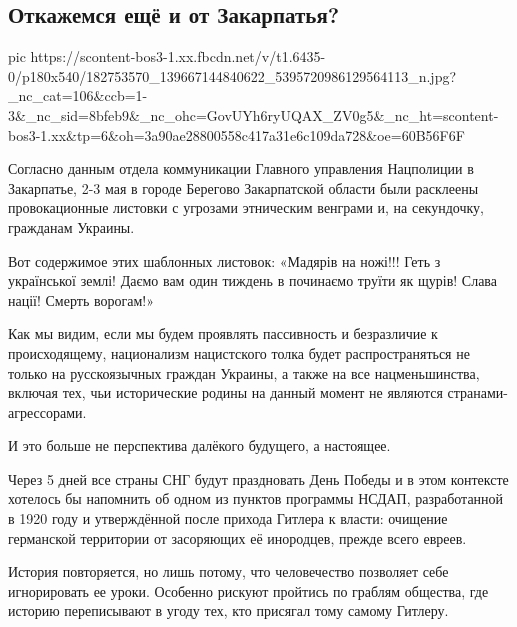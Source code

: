  
 
 
 
 
\subsection{Откажемся ещё и от Закарпатья?}

\ifcmt
  pic https://scontent-bos3-1.xx.fbcdn.net/v/t1.6435-0/p180x540/182753570_139667144840622_5395720986129564113_n.jpg?_nc_cat=106&ccb=1-3&_nc_sid=8bfeb9&_nc_ohc=GovUYh6ryUQAX_ZV0g5&_nc_ht=scontent-bos3-1.xx&tp=6&oh=3a90ae28800558c417a31e6c109da728&oe=60B56F6F
\fi

Согласно данным отдела коммуникации Главного управления Нацполиции в
Закарпатье, 2-3 мая в городе Берегово Закарпатской области были расклеены
провокационные листовки с угрозами этническим венграми и, на секундочку,
гражданам Украины.

Вот содержимое этих шаблонных листовок: «Мадярів на ножі!!! Геть з української
землі! Даємо вам один тиждень в починаємо труїти як щурів! Слава нації! Смерть
ворогам!»

Как мы видим, если мы будем проявлять пассивность и безразличие к
происходящему, национализм нацистского толка будет распространяться не только
на русскоязычных граждан Украины, а также на все нацменьшинства, включая тех,
чьи исторические родины на данный момент не являются странами-агрессорами. 

И это больше не перспектива далёкого будущего, а настоящее.

Через 5 дней все страны СНГ будут праздновать День Победы и в этом контексте
хотелось бы напомнить об одном из пунктов программы НСДАП, разработанной в 1920
году и утверждённой после прихода Гитлера к власти: очищение германской
территории от засоряющих её инородцев, прежде всего евреев.

История повторяется, но лишь потому, что человечество позволяет себе
игнорировать ее уроки. Особенно рискуют пройтись по граблям общества, где
историю переписывают в угоду тех, кто присягал тому самому Гитлеру.

